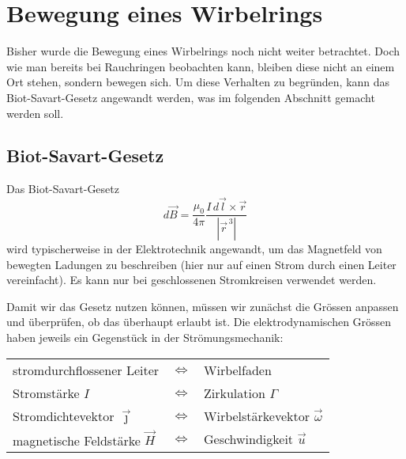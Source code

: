 %
%
%
\section{Bewegung eines Wirbelrings\label{Wirbelringe:Bewegung}}

Bisher wurde die Bewegung eines Wirbelrings noch nicht weiter betrachtet. 
Doch wie man bereits bei Rauchringen beobachten kann, bleiben diese nicht an einem Ort stehen, sondern bewegen sich. 
Um diese Verhalten zu begründen, kann das Biot-Savart-Gesetz \cite{Wirbelringe:FuehrerdurchdieStroemungslehre} angewandt werden, was im folgenden Abschnitt gemacht werden soll.

\subsection{Biot-Savart-Gesetz}

Das Biot-Savart-Gesetz
\[
d \vec{B}
=
\frac{\mu_0}{4\pi}\frac{I \,d \vec{l} \times \vec{r}}{\left\lvert \vec{r}^{\,3}\right\rvert }
\]  %
wird typischerweise in der Elektrotechnik angewandt, um das Magnetfeld von bewegten Ladungen zu beschreiben (hier nur auf einen Strom durch einen Leiter vereinfacht).
Es kann nur bei geschlossenen Stromkreisen verwendet werden. 

Damit wir das Gesetz nutzen können, müssen wir zunächst die Grössen anpassen und überprüfen, ob das überhaupt erlaubt ist. 
Die elektrodynamischen Grössen haben jeweils ein Gegenstück in der Strömungsmechanik:

\begin{center}
    \begin{tabular}{lcl}
    stromdurchflossener Leiter          & \(\Leftrightarrow \) & Wirbelfaden \\
    Stromstärke \(I\)                   & \(\Leftrightarrow \) & Zirkulation \(\Gamma\) \\
    Stromdichtevektor \(\vec{\jmath}\)       & \(\Leftrightarrow \) & Wirbelstärkevektor \(\vec{\omega}\)\\
    magnetische Feldstärke \(\vec{H}\)  & \(\Leftrightarrow \) & Geschwindigkeit \(\vec{u}\) \\
    \end{tabular}
\end{center}

